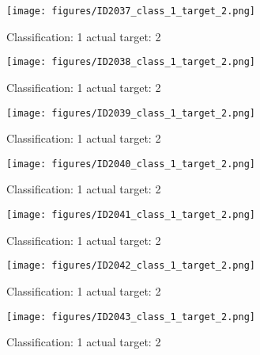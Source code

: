 \begin{figure}[h!]
\begin{center}
\texttt{[image: figures/ID2037\_class\_1\_target\_2.png]}
\end{center}
\caption{ Classification: 1 actual target: 2}
\label{fig:ID2037_class_1_target_2}
\end{figure}
\begin{figure}[h!]
\begin{center}
\texttt{[image: figures/ID2038\_class\_1\_target\_2.png]}
\end{center}
\caption{ Classification: 1 actual target: 2}
\label{fig:ID2038_class_1_target_2}
\end{figure}
\begin{figure}[h!]
\begin{center}
\texttt{[image: figures/ID2039\_class\_1\_target\_2.png]}
\end{center}
\caption{ Classification: 1 actual target: 2}
\label{fig:ID2039_class_1_target_2}
\end{figure}
\begin{figure}[h!]
\begin{center}
\texttt{[image: figures/ID2040\_class\_1\_target\_2.png]}
\end{center}
\caption{ Classification: 1 actual target: 2}
\label{fig:ID2040_class_1_target_2}
\end{figure}
\begin{figure}[h!]
\begin{center}
\texttt{[image: figures/ID2041\_class\_1\_target\_2.png]}
\end{center}
\caption{ Classification: 1 actual target: 2}
\label{fig:ID2041_class_1_target_2}
\end{figure}
\begin{figure}[h!]
\begin{center}
\texttt{[image: figures/ID2042\_class\_1\_target\_2.png]}
\end{center}
\caption{ Classification: 1 actual target: 2}
\label{fig:ID2042_class_1_target_2}
\end{figure}
\begin{figure}[h!]
\begin{center}
\texttt{[image: figures/ID2043\_class\_1\_target\_2.png]}
\end{center}
\caption{ Classification: 1 actual target: 2}
\label{fig:ID2043_class_1_target_2}
\end{figure}
